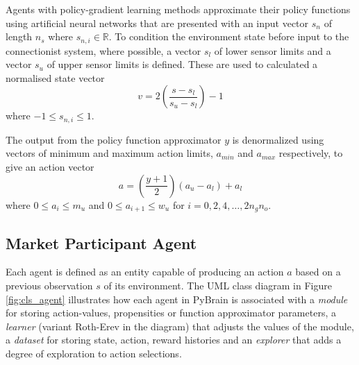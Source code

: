 
Agents with policy-gradient learning methods approximate their policy functions
using artificial neural networks that are presented with an input vector $s_n$
of length $n_s$ where $s_{n,i} \in \mathbb{R}$.  To condition the environment
state before input to the connectionist system, where possible, a vector $s_{l}$
of lower sensor limits and a vector $s_{u}$ of upper sensor limits is defined.
These are used to calculated a normalised state vector
\begin{equation}
v = 2\left(\frac{s - s_{l}}{s_{u} - s_{l}}\right) - 1
\end{equation}
where $-1 \leq s_{n,i} \leq 1$.

The output from the policy function approximator $y$ is denormalized using
vectors of minimum and maximum action limits, $a_{min}$ and $a_{max}$
respectively, to give an action vector
\begin{equation}
a = \left(\frac{y + 1}{2}\right)(a_{u} - a_{l}) + a_{l}
\end{equation}
where $0\leq a_i \leq m_{u}$ and $0\leq a_{i+1} \leq w_{u}$ for $i=0,2,4,
\dotsc, 2n_gn_o$.

\subsection{Market Participant Agent}
Each agent is defined as an entity capable of producing an action $a$ based on a
previous observation $s$ of its environment.
The UML class diagram in Figure \ref{fig:cls_agent} illustrates how each agent
in PyBrain is associated with a \textit{module} for storing action-values,
propensities or function approximator parameters, a \textit{learner} (variant
Roth-Erev in the diagram) that adjusts the values of the module, a
\textit{dataset} for storing state, action, reward histories and an
\textit{explorer} that adds a degree of exploration to action selections.


